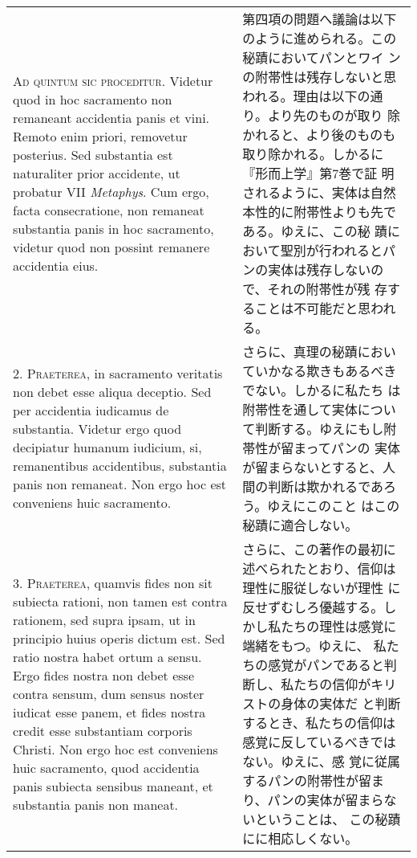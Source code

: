 \documentclass[10pt]{jsarticle} %
\begin{document}
\begin{longtable}{p{21em}p{21em}}
{\scshape Ad quintum sic proceditur}. Videtur quod in hoc sacramento
non remaneant accidentia panis et vini. Remoto enim priori, removetur
posterius. Sed substantia est naturaliter prior accidente, ut probatur
VII {\itshape Metaphys}. Cum ergo, facta consecratione, non remaneat
substantia panis in hoc sacramento, videtur quod non possint remanere
accidentia eius.

&

第四項の問題へ議論は以下のように進められる。この秘蹟においてパンとワイ
ンの附帯性は残存しないと思われる。理由は以下の通り。より先のものが取り
除かれると、より後のものも取り除かれる。しかるに『形而上学』第7巻で証
明されるように、実体は自然本性的に附帯性よりも先である。ゆえに、この秘
蹟において聖別が行われるとパンの実体は残存しないので、それの附帯性が残
存することは不可能だと思われる。


\\



2. {\scshape Praeterea}, in sacramento veritatis non debet esse aliqua
deceptio. Sed per accidentia iudicamus de substantia. Videtur ergo
quod decipiatur humanum iudicium, si, remanentibus accidentibus,
substantia panis non remaneat. Non ergo hoc est conveniens huic
sacramento.

&

さらに、真理の秘蹟においていかなる欺きもあるべきでない。しかるに私たち
は附帯性を通して実体について判断する。ゆえにもし附帯性が留まってパンの
実体が留まらないとすると、人間の判断は欺かれるであろう。ゆえにこのこと
はこの秘蹟に適合しない。

\\



3. {\scshape Praeterea}, quamvis fides non sit subiecta rationi, non
tamen est contra rationem, sed supra ipsam, ut in principio huius
operis dictum est. Sed ratio nostra habet ortum a sensu. Ergo fides
nostra non debet esse contra sensum, dum sensus noster iudicat esse
panem, et fides nostra credit esse substantiam corporis Christi. Non
ergo hoc est conveniens huic sacramento, quod accidentia panis
subiecta sensibus maneant, et substantia panis non maneat.

&

さらに、この著作の最初に述べられたとおり、信仰は理性に服従しないが理性
に反せずむしろ優越する。しかし私たちの理性は感覚に端緒をもつ。ゆえに、
私たちの感覚がパンであると判断し、私たちの信仰がキリストの身体の実体だ
と判断するとき、私たちの信仰は感覚に反しているべきではない。ゆえに、感
覚に従属するパンの附帯性が留まり、パンの実体が留まらないということは、
この秘蹟にに相応しくない。



\end{longtable}
\end{document}
